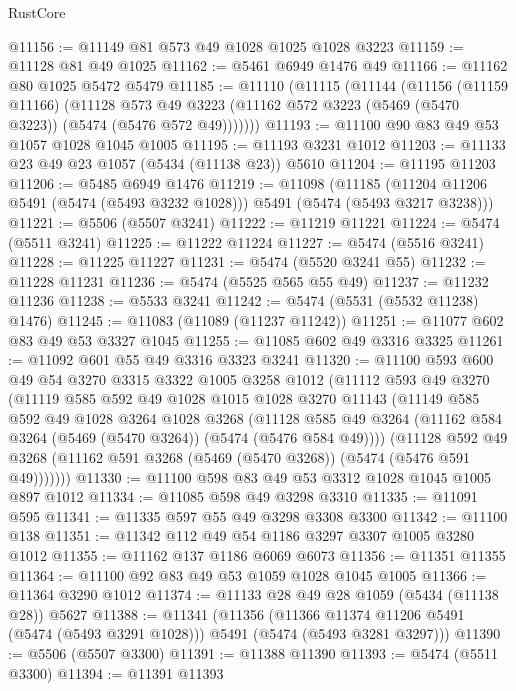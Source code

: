 \begin{lexlean}{RustCore}
\begin{coremodule}
@11156 := @11149 @81 @573 @49 @1028 @1025 @1028 @3223
@11159 := @11128 @81 @49 @1025
@11162 := @5461 @6949 @1476 @49
@11166 := @11162 @80 @1025 @5472 @5479
@11185 := @11110
    (@11115
      (@11144
        (@11156
          (@11159 @11166)
          (@11128
            @573
            @49
            @3223
            (@11162 @572 @3223 (@5469 (@5470 @3223)) (@5474 (@5476 @572 @49)))))))
@11193 := @11100 @90 @83 @49 @53 @1057 @1028 @1045 @1005
@11195 := @11193 @3231 @1012
@11203 := @11133 @23 @49 @23 @1057 (@5434 (@11138 @23)) @5610
@11204 := @11195 @11203
@11206 := @5485 @6949 @1476
@11219 := @11098
    (@11185 (@11204 @11206 @5491 (@5474 (@5493 @3232 @1028))) @5491 (@5474 (@5493 @3217 @3238)))
@11221 := @5506 (@5507 @3241)
@11222 := @11219 @11221
@11224 := @5474 (@5511 @3241)
@11225 := @11222 @11224
@11227 := @5474 (@5516 @3241)
@11228 := @11225 @11227
@11231 := @5474 (@5520 @3241 @55)
@11232 := @11228 @11231
@11236 := @5474 (@5525 @565 @55 @49)
@11237 := @11232 @11236
@11238 := @5533 @3241
@11242 := @5474 (@5531 (@5532 @11238) @1476)
@11245 := @11083 (@11089 (@11237 @11242))
@11251 := @11077 @602 @83 @49 @53 @3327 @1045
@11255 := @11085 @602 @49 @3316 @3325
@11261 := @11092 @601 @55 @49 @3316 @3323 @3241
@11320 := @11100
    @593
    @600
    @49
    @54
    @3270
    @3315
    @3322
    @1005
    @3258
    @1012
    (@11112
      @593
      @49
      @3270
      (@11119
        @585
        @592
        @49
        @1028
        @1015
        @1028
        @3270
        @11143
        (@11149
          @585
          @592
          @49
          @1028
          @3264
          @1028
          @3268
          (@11128 @585 @49 @3264 (@11162 @584 @3264 (@5469 (@5470 @3264)) (@5474 (@5476 @584 @49))))
          (@11128
            @592
            @49
            @3268
            (@11162 @591 @3268 (@5469 (@5470 @3268)) (@5474 (@5476 @591 @49)))))))
@11330 := @11100 @598 @83 @49 @53 @3312 @1028 @1045 @1005 @897 @1012
@11334 := @11085 @598 @49 @3298 @3310
@11335 := @11091 @595
@11341 := @11335 @597 @55 @49 @3298 @3308 @3300
@11342 := @11100 @138
@11351 := @11342 @112 @49 @54 @1186 @3297 @3307 @1005 @3280 @1012
@11355 := @11162 @137 @1186 @6069 @6073
@11356 := @11351 @11355
@11364 := @11100 @92 @83 @49 @53 @1059 @1028 @1045 @1005
@11366 := @11364 @3290 @1012
@11374 := @11133 @28 @49 @28 @1059 (@5434 (@11138 @28)) @5627
@11388 := @11341
    (@11356
      (@11366 @11374 @11206 @5491 (@5474 (@5493 @3291 @1028)))
      @5491
      (@5474 (@5493 @3281 @3297)))
@11390 := @5506 (@5507 @3300)
@11391 := @11388 @11390
@11393 := @5474 (@5511 @3300)
@11394 := @11391 @11393

\end{coremodule}
\end{lexlean}
